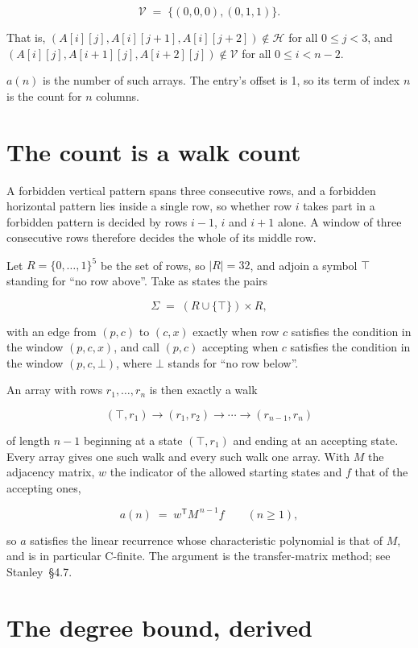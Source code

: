 \documentclass[11pt]{article}
\theoremstyle{definition}
\begin{document}
\[\mathcal{V} \;=\; \{(0,0,0), (0,1,1)\}.\]

That is, $(A[i][j],A[i][j{+}1],A[i][j{+}2]) \notin \mathcal{H}$ for all $0 \le j < 3$, and $(A[i][j],A[i{+}1][j],A[i{+}2][j]) \notin \mathcal{V}$ for all $0 \le i < n-2$.

$a(n)$ is the number of such arrays. The entry's offset is 1, so its term of index $n$ is the count for $n$ columns.

\section{The count is a walk count}

A forbidden vertical pattern spans three consecutive rows, and a forbidden horizontal pattern lies inside a single row, so whether row $i$ takes part in a forbidden pattern is decided by rows $i-1$, $i$ and $i+1$ alone. A window of three consecutive rows therefore decides the whole of its middle row.

Let $R = \{0,\dots,1\}^{5}$ be the set of rows, so $|R| = 32$, and adjoin a symbol $\top$ standing for ``no row above''. Take as states the pairs

\[\Sigma \;=\; (R \cup \{\top\}) \times R,\]

with an edge from $(p,c)$ to $(c,x)$ exactly when row $c$ satisfies the condition in the window $(p,c,x)$, and call $(p,c)$ accepting when $c$ satisfies the condition in the window $(p,c,\bot)$, where $\bot$ stands for ``no row below''.

An array with rows $r_1,\dots,r_n$ is then exactly a walk

\[(\top,r_1) \to (r_1,r_2) \to \cdots \to (r_{n-1},r_n)\]

of length $n-1$ beginning at a state $(\top,r_1)$ and ending at an accepting state. Every array gives one such walk and every such walk one array. With $M$ the adjacency matrix, $w$ the indicator of the allowed starting states and $f$ that of the accepting ones,

\[a(n) \;=\; w^{\mathsf T} M^{\,n-1} f \qquad (n \ge 1),\]

so $a$ satisfies the linear recurrence whose characteristic polynomial is that of $M$, and is in particular C-finite. The argument is the transfer-matrix method; see Stanley~\S4.7.

\section{The degree bound, derived}
\end{document}
